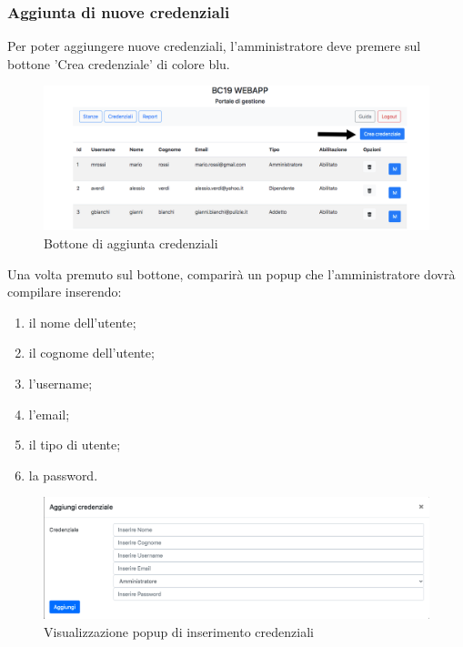\subsubsection{Aggiunta di nuove credenziali}
Per poter aggiungere nuove credenziali, l'amministratore deve premere sul bottone 'Crea credenziale' di colore blu.
\begin{figure}[H]
	\centering
	\includegraphics[width=15cm]{res/images/addCredential.jpg}
	\caption{Bottone di aggiunta credenziali}
\end{figure}
Una volta premuto sul bottone, comparirà un popup che l'amministratore dovrà compilare inserendo:
\begin{enumerate}
	\item il nome dell'utente;
	\item il cognome dell'utente;
	\item l'username;
	\item l'email;
	\item il tipo di utente;
	\item la password.
\end{enumerate}
\begin{figure}[H]
	\centering
	\includegraphics[width=15cm]{res/images/addc.jpg}
	\caption{Visualizzazione popup di inserimento credenziali}
\end{figure}


